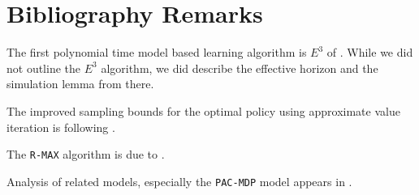 \section{Bibliography Remarks}


The first polynomial time model based learning algorithm is $E^3$ of
\cite{KearnsS02}. While we did not outline the $E^3$ algorithm, we
did describe the effective horizon and the simulation lemma from
there.

The improved sampling bounds for the optimal policy using
approximate value iteration is following \cite{KearnsS98a}.

The {\tt R-MAX} algorithm is due to \cite{BrafmanT02}.

Analysis of related models, especially the {\tt PAC-MDP} model
appears in \cite{StrehlLL09,Li2012}.




